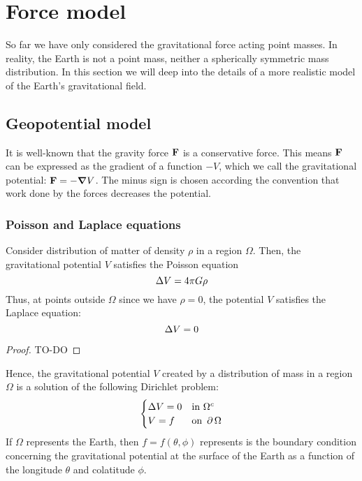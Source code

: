 \documentclass[../main.tex]{subfiles}
\begin{document}
\section{Force model}\label{sec:force}
So far we have only considered the gravitational force acting point masses. In reality, the Earth is not a point mass, neither a spherically symmetric mass distribution. In this section we will deep into the details of a more realistic model of the Earth's gravitational field.
\subsection{Geopotential model}
It is well-known that the gravity force $\boldsymbol{\mathrm{F}}$ is a conservative force. This means $\boldsymbol{\mathrm{F}}$ can be expressed as the gradient of a function $-V$, which we call the gravitational potential: $\boldsymbol{\mathrm{F}}=-\grad V$. The minus sign is chosen according the convention that work done by the forces decreases the potential.
\subsubsection{Poisson and Laplace equations}
\begin{theorem}
  Consider distribution of matter of density $\rho$ in a region $\Omega$. Then, the gravitational potential $V$ satisfies the Poisson equation
  \begin{equation}
    \Delta V = 4\pi G \rho
  \end{equation}
  Thus, at points outside $\Omega$ since we have $\rho=0$, the potential $V$ satisfies the Laplace equation:
  \begin{equation}
    \Delta V = 0
  \end{equation}
\end{theorem}
\begin{proof}
  TO-DO
\end{proof}
Hence, the gravitational potential $V$ created by a distribution of mass in a region $\Omega$ is a solution of the following Dirichlet problem:
\begin{equation}
  \begin{cases}
    \Delta V = 0 & \text{in } \Omega^c    \\
    V = f            & \text{on } \operatorname{\partial}{\Omega}
  \end{cases}
\end{equation}
If $\Omega$ represents the Earth, then $f=f(\theta,\phi)$ represents is the boundary condition concerning the gravitational potential at the surface of the Earth as a function of the longitude $\theta$ and colatitude $\phi$.
\end{document}
